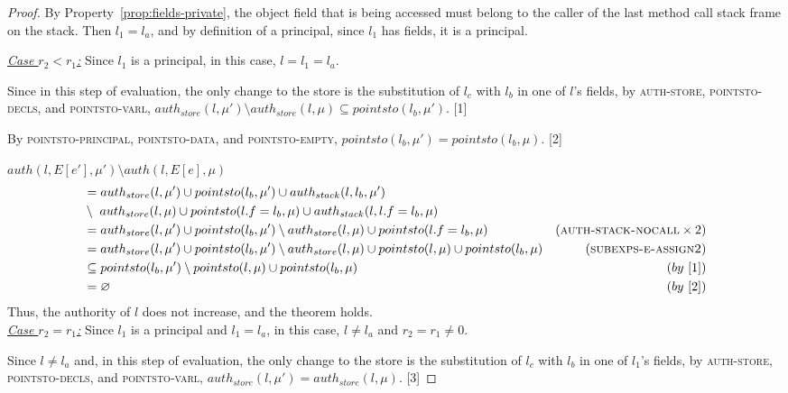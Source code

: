 \documentclass{llncs}
\begin{document}
\begin{proof}
By Property~\ref{prop:fields-private}, the object field that is being accessed must belong to the caller of the last method call stack frame on the stack. Then $l_1 = l_a$, and by definition of a principal, since $l_1$ has fields, it is a principal.

\noindent\underline{\underline{\textit{Case $r_2 < r_1$:}}} Since $l_1$ is a principal, in this case, $l = l_1 = l_a$.

Since in this step of evaluation, the only change to the store is the substitution of $l_c$ with $l_b$ in one of $l$'s fields, by \textsc{auth-store}, \textsc{pointsto-decls}, and \textsc{pointsto-varl}, $auth_{store}(l, \mu') \setminus auth_{store}(l, \mu) \subseteq pointsto(l_b, \mu')$. [1]

By \textsc{pointsto-principal}, \textsc{pointsto-data}, and \textsc{pointsto-empty}, $pointsto(l_b, \mu') = pointsto(l_b, \mu)$. \hspace{12pt} [2]

\noindent$auth(l, E[e'], \mu') \setminus auth(l, E[e], \mu)$
\vspace{-7pt}
\begin{align*}
&= auth_{store}(l, \mu') \cup pointsto(l_b, \mu') \cup auth_{stack}(l, l_b, \mu')\\
&\setminus~auth_{store}(l, \mu) \cup pointsto(l.f = l_b, \mu) \cup auth_{stack}(l, l.f = l_b, \mu)\\
&= auth_{store}(l, \mu') \cup pointsto(l_b, \mu') \setminus auth_{store}(l, \mu) \cup pointsto(l.f = l_b, \mu) & (\textsc{auth-stack-nocall} \times 2)\\
&= auth_{store}(l, \mu') \cup pointsto(l_b, \mu') \setminus auth_{store}(l, \mu) \cup pointsto(l, \mu) \cup pointsto(l_b, \mu) & (\textsc{subexps-e-assign2})\\
&\subseteq pointsto(l_b, \mu') \setminus pointsto(l, \mu) \cup pointsto(l_b, \mu) & (by~[1])\\
&= \varnothing & (by~[2])
\end{align*}
Thus, the authority of $l$ does not increase, and the theorem holds.\\

\noindent\underline{\underline{\textit{Case $r_2 = r_1$:}}} Since $l_1$ is a principal and $l_1 = l_a$, in this case, $l \neq l_a$ and $r_2 = r_1 \neq 0$.

Since $l \neq l_a$ and, in this step of evaluation, the only change to the store is the substitution of $l_c$ with $l_b$ in one of $l_1$'s fields, by \textsc{auth-store}, \textsc{pointsto-decls}, and \textsc{pointsto-varl}, $auth_{store}(l, \mu') = auth_{store}(l, \mu)$. [3]


\end{proof}
\end{document}
